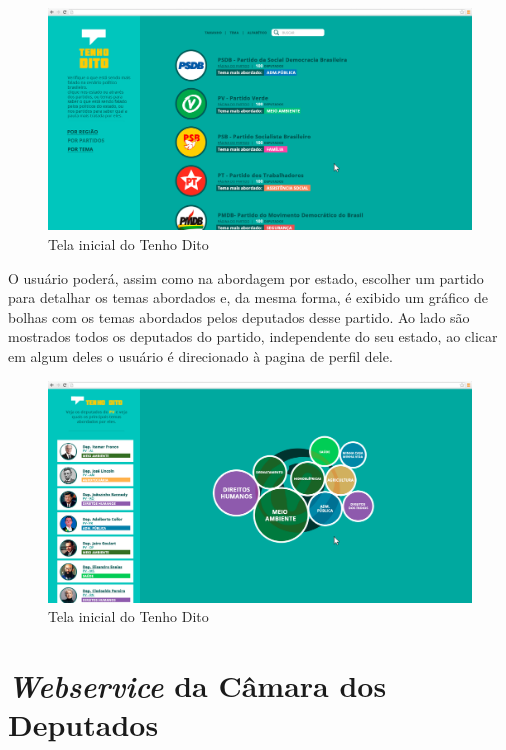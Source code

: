 \begin{apendicesenv}
\begin{figure}[h]
  \centering
  \includegraphics[scale=0.2]{figuras/tenhodito4.eps}
  \caption{Tela inicial do Tenho Dito}
  \label{tenhodito4}
\end{figure}

O usuário poderá, assim como na abordagem por estado, escolher um partido para detalhar os temas abordados e, da mesma forma, é exibido um gráfico de bolhas com os temas abordados pelos deputados desse partido. Ao lado são mostrados todos os deputados do partido, independente do seu estado, ao clicar em algum deles o usuário é direcionado à pagina de perfil dele.

\begin{figure}[h]
  \centering
  \includegraphics[scale=0.2]{figuras/tenhodito5.eps}
  \caption{Tela inicial do Tenho Dito}
  \label{tenhodito5}
\end{figure}

\chapter{\textit{Webservice} da Câmara dos Deputados}
\label{estrutura-webservice}


\end{apendicesenv}
